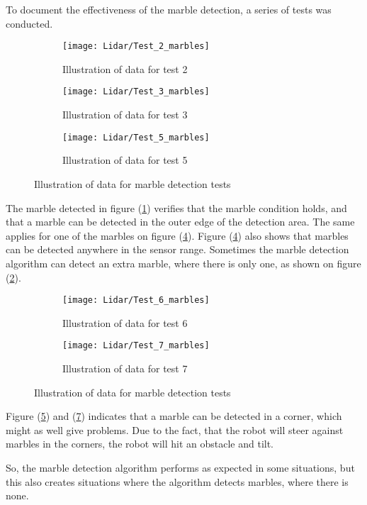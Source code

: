 \documentclass[../Head/Main.tex]{subfiles}
\begin{document}
\clearpage
To document the effectiveness of the marble detection, a series of tests was conducted.
\begin{figure}[H]
  \begin{subfigure}[b]{0.3\textwidth}
  	\centering
    \texttt{[image: Lidar/Test\_2\_marbles]}
    \caption{Illustration of data for test 2}
    \label{fig:MarbleTest2}
  \end{subfigure}
  \hfill
  \begin{subfigure}[b]{0.3\textwidth}
  	\centering
    \texttt{[image: Lidar/Test\_3\_marbles]}
    \caption{Illustration of data for test 3}
    \label{fig:MarbleTest3}
  \end{subfigure}
  \hfill
  \begin{subfigure}[b]{0.3\textwidth}
    \centering
    \texttt{[image: Lidar/Test\_5\_marbles]}
    \caption{Illustration of data for test 5}
    \label{fig:MarbleTest5}
  \end{subfigure}
  \caption{Illustration of data for marble detection tests}
\end{figure}
The marble detected in figure (\ref{fig:MarbleTest2}) verifies that the marble condition holds, and that a marble can be detected in the outer edge of the detection area. The same applies for one of the marbles on figure (\ref{fig:MarbleTest5}). Figure (\ref{fig:MarbleTest5}) also shows that marbles can be detected anywhere in the sensor range. Sometimes the marble detection algorithm can detect an extra marble, where there is only one, as shown on figure (\ref{fig:MarbleTest3}). 
\begin{figure}[H]
  \begin{subfigure}[b]{0.5\textwidth}
  	\centering
    \texttt{[image: Lidar/Test\_6\_marbles]}
    \caption{Illustration of data for test 6}
    \label{fig:MarbleTest6}
  \end{subfigure}
  \hfill
  \begin{subfigure}[b]{0.5\textwidth}
  	\centering
    \texttt{[image: Lidar/Test\_7\_marbles]}
    \caption{Illustration of data for test 7}
    \label{fig:MarbleTest7}
  \end{subfigure}
  \caption{Illustration of data for marble detection tests}
\end{figure}
Figure (\ref{fig:MarbleTest6}) and (\ref{fig:MarbleTest7}) indicates that a marble can be detected in a corner, which might as well give problems. Due to the fact, that the robot will steer against marbles in the corners, the robot will hit an obstacle and tilt.\par
So, the marble detection algorithm performs as expected in some situations, but this also creates situations where the algorithm detects marbles, where there is none. 
\end{document}
